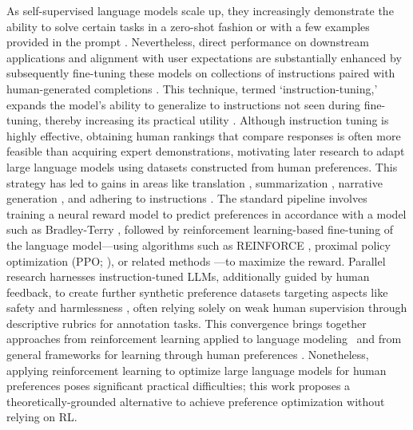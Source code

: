 As self-supervised language models scale up, they increasingly demonstrate the ability to solve certain tasks in a zero-shot fashion \citep{radford2019language} or with a few examples provided in the prompt \citep{gpt3,megatron,chowdhery2022palm}. Nevertheless, direct performance on downstream applications and alignment with user expectations are substantially enhanced by subsequently fine-tuning these models on collections of instructions paired with human-generated completions \citep{mishra-etal-2022-cross,sanh2022multitask,chung2022scaling,thoppilan2022lamda}. This technique, termed `instruction-tuning,' expands the model's ability to generalize to instructions not seen during fine-tuning, thereby increasing its practical utility \citep{chung2022scaling}. Although instruction tuning is highly effective, obtaining human rankings that compare responses is often more feasible than acquiring expert demonstrations, motivating later research to adapt large language models using datasets constructed from human preferences. This strategy has led to gains in areas like translation \citep{kreutzer-etal-2018-reliability}, summarization \citep{stiennon2022learning,ziegler2020finetuning}, narrative generation \citep{ziegler2020finetuning}, and adhering to instructions \citep{ouyang2022training,ramamurthy2023is}. The standard pipeline involves training a neural reward model to predict preferences in accordance with a model such as Bradley-Terry \citep{bradley1952rankanalysis}, followed by reinforcement learning-based fine-tuning of the language model—using algorithms such as REINFORCE \citep{williams1992reinforce}, proximal policy optimization (PPO; \cite{schulman2017proximal}), or related methods \citep{ramamurthy2023is}—to maximize the reward. Parallel research harnesses instruction-tuned LLMs, additionally guided by human feedback, to create further synthetic preference datasets targeting aspects like safety and harmlessness \citep{bai2022constitutional}, often relying solely on weak human supervision through descriptive rubrics for annotation tasks. This convergence brings together approaches from reinforcement learning applied to language modeling~\citep{Ranzato2015SequenceLT,paulus2018a,wu2018learning} and from general frameworks for learning through human preferences \citep{christiano2017deep,kupcsik2018learning}. Nonetheless, applying reinforcement learning to optimize large language models for human preferences poses significant practical difficulties; this work proposes a theoretically-grounded alternative to achieve preference optimization without relying on RL.

